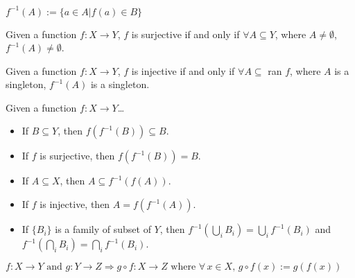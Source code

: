 \label{preimage}
$f^{-1}(A) := \{a \in A | f(a) \in B \}$

\begin{proposition}
Given a function $f: X \rightarrow Y$, $f$ is surjective if and only if $\forall A \subseteq Y$, where $A \neq \emptyset$, $f^{-1}(A) \neq \emptyset$.
\end{proposition}

\begin{proposition}
Given a function $f: X \rightarrow Y$, $f$ is injective if and only if $\forall A \subseteq$ ran $f$, where $A$ is a singleton, $f^{-1}(A)$ is a singleton.
\end{proposition}

\begin{proposition}
Given a function $f : X \rightarrow Y$\dots
\begin{itemize}
  \item If $B \subseteq Y$, then $f(f^{-1}(B)) \subseteq B.$
  \item If $f$ is surjective, then $f(f^{-1}(B)) = B.$
  \item If $A \subseteq X$, then $A \subseteq f^{-1}(f(A)).$
  \item If $f$ is injective, then $A = f(f^{-1}(A)).$
  \item If $\{B_i\}$ is a family of subset of $Y$, then $f^{-1}(\bigcup_i B_i)=\bigcup_i f^{-1}(B_i)$ and $f^{-1}(\bigcap_i B_i)=\bigcap_i f^{-1}(B_i).$
\end{itemize}
\end{proposition}

\label{functioncomposition}
$f:X \rightarrow Y \textrm{ and } g:Y \rightarrow Z \Rightarrow g \circ f:X \rightarrow Z \textrm{ where } \forall \, x \in X, \, g \circ f(x) := g(f(x))$

